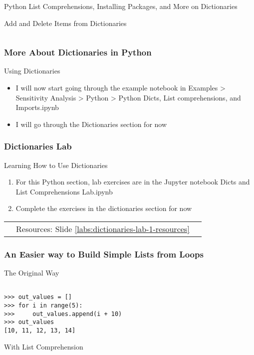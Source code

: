 \documentclass[handout, 11pt]{beamer}
\begin{document}
\begin{section}{Python List Comprehensions, Installing Packages, and More on Dictionaries}
\begin{frame}[fragile]
\begin{block}{Add and Delete Items from Dictionaries}
\begin{verbatim}
\end{verbatim}
\end{block}
\end{frame}
\begin{frame}
\frametitle{More About Dictionaries in Python}
{
\begin{block}{Using Dictionaries}
\begin{itemize}
\item I will now start going through the example notebook in Examples > Sensitivity Analysis > Python > Python Dicts, List comprehensions, and Imports.ipynb
\item I will go through the Dictionaries section for now
\end{itemize}
\end{block}
}
\end{frame}
\begin{frame}
\frametitle{Dictionaries Lab}
{
\begin{block}{Learning How to Use Dictionaries}
\begin{enumerate}
\item For this Python section, lab exercises are in the Jupyter notebook Dicts and List Comprehensions Lab.ipynb
\item Complete the exercises in the dictionaries section for now
\end{enumerate}
\vfill
\begin{tabular*}{\textwidth}{@{\extracolsep{\fill}}ccc}
\toprule
\hfill & Resources: Slide \textcolor{blue}{\underline{\ref{labs:dictionaries-lab-1-resources}}} & \hfill\\

\end{tabular*}
\end{block}
}
\label{labs:dictionaries-lab-1}
\end{frame}
\begin{frame}[fragile]
\frametitle{An Easier way to Build Simple Lists from Loops}
\small
\begin{block}{The Original Way}
\begin{verbatim}

>>> out_values = []
>>> for i in range(5):
>>>     out_values.append(i + 10)
>>> out_values
[10, 11, 12, 13, 14]

\end{verbatim}
\end{block}
\begin{block}{With List Comprehension}
\begin{verbatim}


\end{verbatim}
\end{block}
\end{frame}
\end{section}
\end{document}
